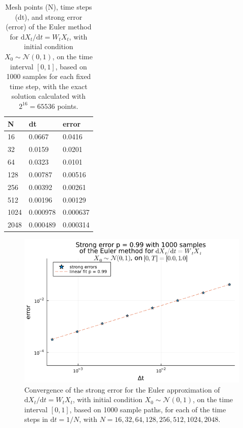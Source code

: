 \documentclass[reqno,12pt]{amsart}
\theoremstyle{plain}%
\theoremstyle{definition}
\begin{document}
\begin{table}
    \label{tablinearhomogeneousrode}
    \begin{tabular}[htb]{|l|l|l|}
        \hline N & dt & error \\
        \hline \hline 16 & 0.0667 & 0.0416 \\
        32 & 0.0159 & 0.0201 \\
        64 & 0.0323 & 0.0101 \\
        128 & 0.00787 & 0.00516 \\
        256 & 0.00392 & 0.00261 \\
        512 & 0.00196 & 0.00129 \\
        1024 & 0.000978 & 0.000637 \\
        2048 & 0.000489 & 0.000314 \\
        \hline
    \end{tabular}
    \caption{Mesh points (N), time steps (dt), and strong error (error) of the Euler method for $\mathrm{d}X_t/\mathrm{d}t = W_t X_t$, with initial condition $X_0 \sim \mathcal{N}(0, 1)$, on the time interval $[0, 1]$, based on 1000 samples for each fixed time step, with the exact solution calculated with $2^{16}=65536$ points.}
\end{table}

\begin{figure}[htb]
    \label{figlinearhomogeneousrode}
    \includegraphics[scale=0.7]{img/order_linearhomogenous.png}
    \caption{Convergence of the strong error for the Euler approximation of $\mathrm{d}X_t/\mathrm{d}t = W_t X_t$, with initial condition $X_0 \sim \mathcal{N}(0, 1)$, on the time interval $[0, 1]$, based on 1000 sample paths, for each of the time steps in $\mathrm{d}t = 1/N$, with $N = 16, 32, 64, 128, 256, 512, 1024, 2048$.}
\end{figure}
\end{document}
